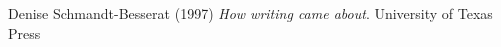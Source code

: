 \documentclass[a4paper,landscape,headrule,footrule,xetex]{foils}
\begin{document}
Denise Schmandt-Besserat (1997) \textit{How writing came about}. University of Texas Press


\end{document}
